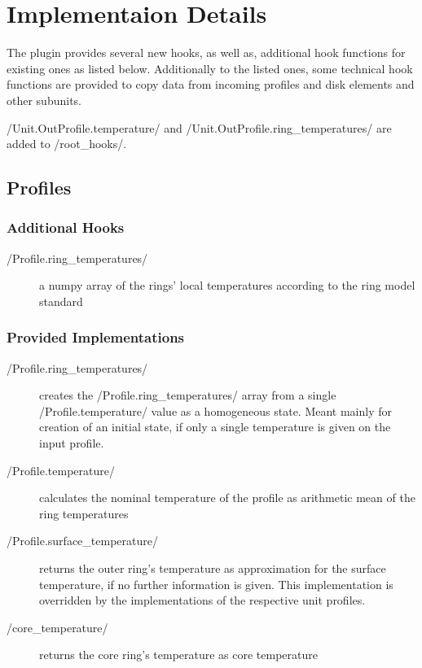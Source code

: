 \documentclass{PyRollDocs}
\begin{document}
    \section{Implementaion Details}

    The plugin provides several new hooks, as well as, additional hook functions for existing ones as listed below.
    Additionally to the listed ones, some technical hook functions are provided to copy data from incoming profiles and disk elements and other subunits.

    \py/Unit.OutProfile.temperature/ and \py/Unit.OutProfile.ring_temperatures/ are added to \py/root_hooks/.

    \subsection{Profiles}

    \subsubsection{Additional Hooks}

    \begin{description}
        \item[\py/Profile.ring_temperatures/] a numpy array of the rings' local temperatures according to the ring model standard
    \end{description}

    \subsubsection{Provided Implementations}

    \begin{description}
        \item[\py/Profile.ring_temperatures/] creates the \py/Profile.ring_temperatures/ array from a single \py/Profile.temperature/ value as a homogeneous state.
        Meant mainly for creation of an initial state, if only a single temperature is given on the input profile.
        \item[\py/Profile.temperature/] calculates the nominal temperature of the profile as arithmetic mean of the ring temperatures
        \item[\py/Profile.surface_temperature/] returns the outer ring's temperature as approximation for the surface temperature, if no further information is given.
        This implementation is overridden by the implementations of the respective unit profiles.
        \item[\py/core_temperature/] returns the core ring's temperature as core temperature
    \end{description}
\end{document}
